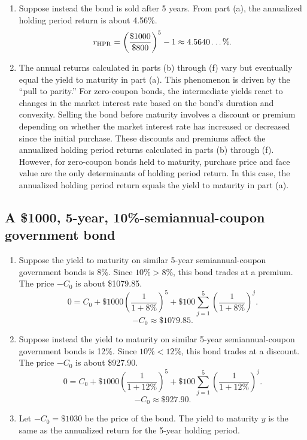\documentclass[12pt]{article}
\begin{document}
\begin{enumerate}
\item Suppose instead the bond is sold after 5 years. From part (a), the annualized holding period return is about 4.56\%. \[r_{\rm HPR}=\left(\frac{\$1000}{\$800}\right)^5-1\approx 4.5640\dots\%.\]
\item The annual returns calculated in parts (b) through (f) vary but eventually equal the yield to maturity in part (a). This phenomenon is driven by the ``pull to parity.'' For zero-coupon bonds, the intermediate yields react to changes in the market interest rate based on the bond's duration and convexity. Selling the bond before maturity involves a discount or premium depending on whether the market interest rate has increased or decreased since the initial purchase. These discounts and premiums affect the annualized holding period returns calculated in parts (b) through (f). However, for zero-coupon bonds held to maturity, purchase price and face value are the only determinants of holding period return. In this case, the annualized holding period return equals the yield to maturity in part (a).
\end{enumerate}
\subsection{A \$1000, 5-year, 10\%-semiannual-coupon government bond}
\begin{enumerate}
\item Suppose the yield to maturity on similar 5-year semiannual-coupon government bonds is 8\%. Since $10\%>8\%$, this bond trades at a premium. The  price $-C_0$ is about \$1079.85. \[0=C_0+\$1000\left(\frac{1}{1+8\%}\right)^5+\$100\sum_{j=1}^5{\left(\frac{1}{1+8\%}\right)^j}.\]
\[-C_0\approx\$1079.85.\]
\item Suppose instead the yield to maturity on similar 5-year semiannual-coupon government bonds is 12\%. Since $10\%<12\%$, this bond trades at a discount. The price $-C_0$ is about \$927.90. \[0=C_0+\$1000\left(\frac{1}{1+12\%}\right)^5+\$100\sum_{j=1}^5{\left(\frac{1}{1+12\%}\right)^j}.\]
\[-C_0\approx\$927.90.\]
\item Let $-C_0=\$1030$ be the price of the bond. The yield to maturity $y$ is the same as the annualized return for the 5-year holding period.
\end{enumerate}
\end{document}
